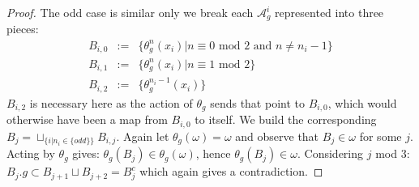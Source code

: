 \begin{proof}
The odd case is similar only we break each $\mathcal{A}_{g}^{i}$ represented into three pieces:
\begin{eqnarray*}
B_{i,0} & := & \lbrace \theta_{g}^{n}(x_{i}) |n \equiv 0 \mbox{ mod } 2 \mbox{ and } n\not = n_{i}-1 \rbrace \\
B_{i,1}& := & \lbrace \theta_{g}^{n}(x_{i}) |n \equiv 1 \mbox{ mod } 2 \rbrace \\
B_{i,2}& := & \lbrace \theta_{g}^{n_{i}-1}(x_{i}) \rbrace
\end{eqnarray*}
$B_{i,2}$ is necessary here as the action of $\theta_{g}$ sends that point to $B_{i,0}$, which would otherwise have been a map from $B_{i,0}$ to itself. We build the corresponding $B_{j}=\sqcup_{\lbrace i | n_{i} \in \lbrace odd \rbrace \rbrace} B_{i,j}$. Again let $\theta_{g}(\omega)=\omega$ and observe that $B_{j} \in \omega$ for some $j$. Acting by $\theta_{g}$ gives: $\theta_{g}(B_{j})\in \theta_{g}(\omega)$, hence $\theta_{g}(B_{j})\in \omega$. Considering $j$ mod $3$: $B_{j}.g\subset B_{j+1}\sqcup B_{j+2}= B_{j}^{c}$ which again gives a contradiction.
\end{proof}


